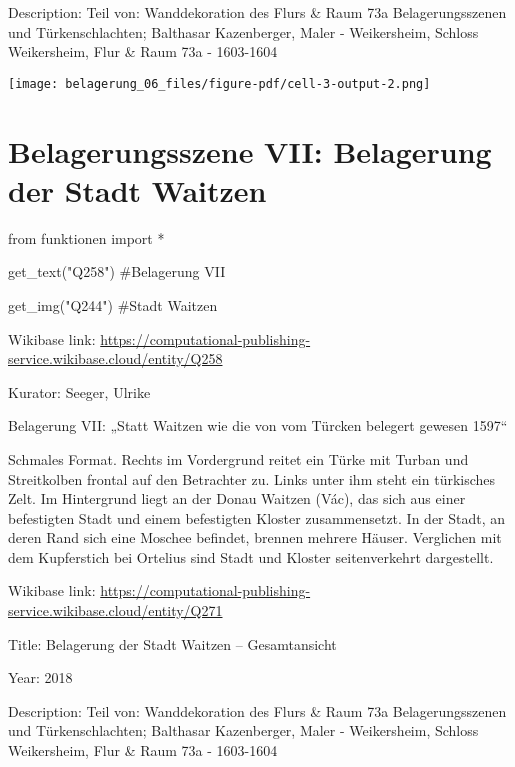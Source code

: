 \documentclass[
  a4paper,
  portrait]{book}
\newenvironment{Shaded}{\begin{snugshade}}{\end{snugshade}}
\newcommand{\CommentTok}[1]{\textcolor[rgb]{0.37,0.37,0.37}{#1}}
\newcommand{\ImportTok}[1]{\textcolor[rgb]{0.00,0.46,0.62}{#1}}
\newcommand{\NormalTok}[1]{\textcolor[rgb]{0.00,0.23,0.31}{#1}}
\newcommand{\OperatorTok}[1]{\textcolor[rgb]{0.37,0.37,0.37}{#1}}
\newcommand{\StringTok}[1]{\textcolor[rgb]{0.13,0.47,0.30}{#1}}
\begin{document}
Description: Teil von: Wanddekoration des Flurs \& Raum 73a
Belagerungsszenen und Türkenschlachten; Balthasar Kazenberger, Maler -
Weikersheim, Schloss Weikersheim, Flur \& Raum 73a - 1603-1604

\texttt{[image: belagerung\_06\_files/figure-pdf/cell-3-output-2.png]}

\chapter{Belagerungsszene VII: Belagerung der Stadt
Waitzen}\label{belagerungsszene-vii-belagerung-der-stadt-waitzen}

\begin{Shaded}
\begin{Highlighting}[]
\ImportTok{from}\NormalTok{ funktionen }\ImportTok{import} \OperatorTok{*}
\end{Highlighting}
\end{Shaded}

\begin{Shaded}
\begin{Highlighting}[]
\NormalTok{get\_text(}\StringTok{"Q258"}\NormalTok{)}
\CommentTok{\#Belagerung VII}

\NormalTok{get\_img(}\StringTok{"Q244"}\NormalTok{)}
\CommentTok{\#Stadt Waitzen}
\end{Highlighting}
\end{Shaded}

Wikibase link:
\url{https://computational-publishing-service.wikibase.cloud/entity/Q258}

Kurator: Seeger, Ulrike

Belagerung VII: „Statt Waitzen wie die von vom Türcken belegert gewesen
1597``

Schmales Format. Rechts im Vordergrund reitet ein Türke mit Turban und
Streitkolben frontal auf den Betrachter zu. Links unter ihm steht ein
türkisches Zelt. Im Hintergrund liegt an der Donau Waitzen (Vác), das
sich aus einer befestigten Stadt und einem befestigten Kloster
zusammensetzt. In der Stadt, an deren Rand sich eine Moschee befindet,
brennen mehrere Häuser. Verglichen mit dem Kupferstich bei Ortelius sind
Stadt und Kloster seitenverkehrt dargestellt.

Wikibase link:
\url{https://computational-publishing-service.wikibase.cloud/entity/Q271}

Title: Belagerung der Stadt Waitzen -- Gesamtansicht

Year: 2018

Description: Teil von: Wanddekoration des Flurs \& Raum 73a
Belagerungsszenen und Türkenschlachten; Balthasar Kazenberger, Maler -
Weikersheim, Schloss Weikersheim, Flur \& Raum 73a - 1603-1604
\end{document}
